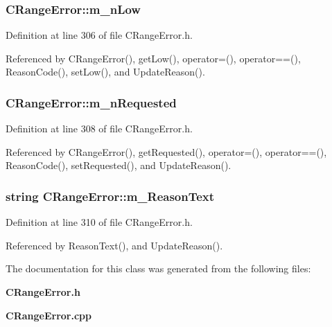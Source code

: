 \subsubsection{ CRange\-Error::m\_\-n\-Low\hspace{0.3cm}{\tt  [private]}}\label{classCRangeError_o0}




Definition at line 306 of file CRange\-Error.h.

Referenced by CRange\-Error(), get\-Low(), operator=(), operator==(), Reason\-Code(), set\-Low(), and Update\-Reason().
\subsubsection{ CRange\-Error::m\_\-n\-Requested\hspace{0.3cm}{\tt  [private]}}\label{classCRangeError_o2}




Definition at line 308 of file CRange\-Error.h.

Referenced by CRange\-Error(), get\-Requested(), operator=(), operator==(), Reason\-Code(), set\-Requested(), and Update\-Reason().
\subsubsection{\setlength{\rightskip}{0pt plus 5cm}string CRange\-Error::m\_\-Reason\-Text\hspace{0.3cm}{\tt  [private]}}\label{classCRangeError_o3}




Definition at line 310 of file CRange\-Error.h.

Referenced by Reason\-Text(), and Update\-Reason().

The documentation for this class was generated from the following files:\begin{CompactItemize}
\item 
{\bf CRange\-Error.h}\item 
{\bf CRange\-Error.cpp}\end{CompactItemize}
